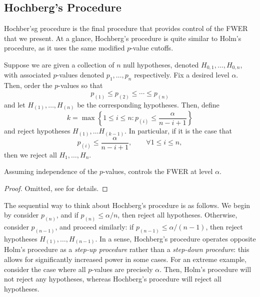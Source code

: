 \subsection{Hochberg's Procedure}
Hochber'sg procedure is the final procedure that provides control of the FWER that we present. At a glance, Hochberg's procedure is quite similar to Holm's procedure, as it uses the same modified $p$-value cutoffs.
\begin{proc}
\label{hochproc}
Suppose we are given a collection of $n$ null hypotheses, denoted $H_{0, 1}, \ldots, H_{0, n}$, with associated $p$-values denoted $p_1, \ldots, p_n$ respectively. Fix a desired level $\alpha$. Then, order the $p$-values so that
\[ p_{(1)} \leq p_{(2)} \leq \cdots \leq p_{(n)} \] and let $H_{(1)}, \ldots, H_{(n)}$ be the corresponding hypotheses. Then, define
\[ k = \max \left\{ 1 \leq i \leq n : p_{(i)} \leq \frac{\alpha}{n - i + 1} \right \}  \] and reject hypotheses $H_{(1)}, \ldots H_{(k-1)}$. In particular, if it is the case that 
\[ p_{(i)} \leq \frac{\alpha}{n - i + 1}, \qquad \forall 1 \leq i \leq n, \] then we reject all $H_1, \ldots, H_n$.
\end{proc}
\begin{prop}
Assuming independence of the $p$-values,  controls the FWER at level $\alpha$.
\end{prop}
\begin{proof}
Omitted, see \cite{stat300} for details.
\end{proof}

\begin{note*}
The sequential way to think about Hochberg's procedure is as follows. We begin by consider $p_{(n)}$, and if $p_{(n)} \leq \alpha / n$, then reject all hypotheses. Otherwise, consider $p_{(n-1)}$, and proceed similarly: if $p_{(n-1)} \leq \alpha / (n-1)$, then reject hypotheses $H_{(1)}, \ldots, H_{(n-1)}$. In a sense, Hochberg's procedure operates opposite Holm's procedure as a \emph{step-up procedure} rather than a \emph{step-down procedure}: this allows for significantly increased power in some cases. For an extreme example, consider the case where all $p$-values are precisely $\alpha$. Then, Holm's procedure will not reject any hypotheses, whereas Hochberg's procedure will reject all hypotheses. 
\end{note*}



